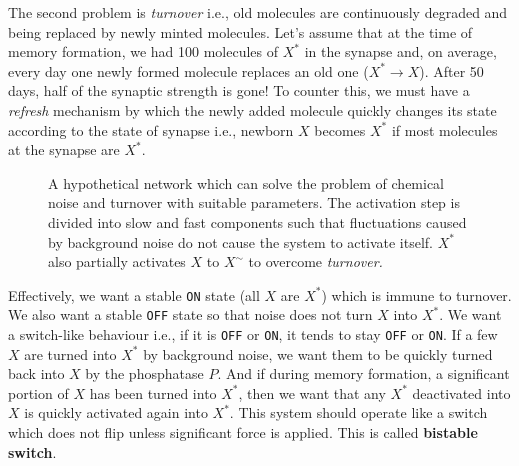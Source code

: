\documentclass[]{resonance}
\begin{document}
The second problem is \textit{turnover} i.e., old molecules are continuously
degraded and being replaced by newly minted molecules. Let's assume that at the
time of memory formation, we had 100 molecules of $X^*$ in the synapse and, on
average, every day one newly formed molecule replaces an
old one ($X^* \rightarrow X$).  After 50 days, half of the synaptic strength is
gone! To counter this, we must have a \textit{refresh} mechanism by which the
newly added molecule quickly changes its state according to the state of synapse
i.e., newborn $X$ becomes $X^*$ if most molecules at the synapse are $X^*$.

\begin{figure}[]
    \centering
    \caption{A hypothetical network which can solve the problem of chemical noise and
        turnover with suitable parameters. The activation step is divided
        into slow and fast components such that fluctuations caused by background
        noise do not cause the system to activate itself. $X^*$ also partially
        activates $X$ to $X^\sim$ to overcome \textit{turnover.}
    }\label{fig:model_bistable}
    \vspace{2mm}
\end{figure}

Effectively, we want a stable \texttt{ON} state (all $X$ are $X^*$) which is
immune to turnover. We also want a stable \texttt{OFF} state so that noise does
not turn $X$ into $X^*$.  We want a switch-like behaviour i.e., if it is
\texttt{OFF} or \texttt{ON}, it tends to stay \texttt{OFF} or \texttt{ON}. If a
few $X$ are turned into $X^*$ by background noise, we want them to be quickly
turned back into $X$ by the phosphatase $P$. And if during memory formation, a
significant portion of $X$ has been turned into $X^*$, then we want that any
$X^*$ deactivated into $X$ is quickly activated again into $X^*$. This system
should operate like a switch which does not flip unless significant force is
applied. This is called \textbf{bistable switch}.
\end{document}

